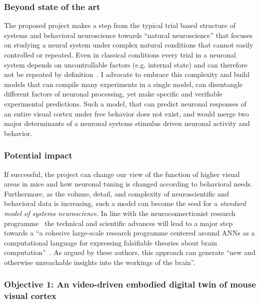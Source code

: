 \documentclass[COG,11pt]{ercgrant}
\begin{document}
\subsubsection{Beyond state of the art}
The proposed project makes a step from the typical trial based structure of systems and behavioral neuroscience towards ``natural neuroscience'' that focuses on studying a neural system under complex natural conditions that cannot easily controlled or repeated. Even in classical conditions every trial in a neuronal system depends on uncontrollable factors (e.g. internal state) and can therefore not be repeated by definition~\parencite{Urai2022-fz}. I advocate to embrace this complexity and build models that can compile many experiments in a single model, can disentangle different factors of neuronal processing, yet make specific and verifiable experimental predictions. 
Such a model, that can predict neuronal responses of an entire visual cortex under free behavior does not exist, and would merge two major determinants of a neuronal systems stimulus driven neuronal activity and behavior. 

\subsubsection{Potential impact}
If successful, the project can change our view of the function of higher visual areas in mice and how neuronal tuning is changed according to behavioral needs. 
Furthermore, as the volume, detail, and complexity of neuroscientific and behavioral data is increasing, such a model can become the seed for a \textit{standard model of systems neuroscience}.
In line with the neuroconnectionist research programme~ the technical and scientific advances will lead to a major step towards a ``a cohesive large-scale research programme centered around ANNs as a computational language for expressing falsifiable theories about brain computation''~\parencite{Doerig2022-ex}. As argued by these authors, this approach can generate ``new and otherwise unreachable insights into the workings of the brain''.


\subsubsection{\colorbox{obji}{\color{white}Objective 1}: An video-driven embodied digital twin of mouse visual cortex}
\label{sub:obji}
\end{document}
